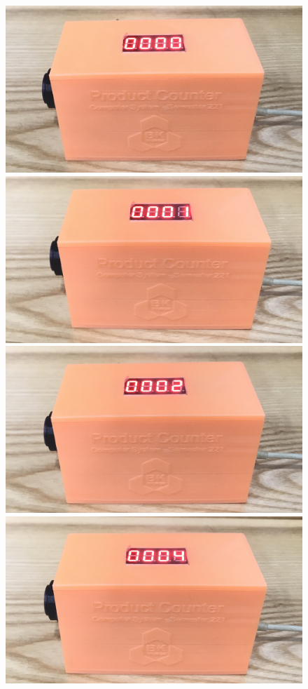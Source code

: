 \documentclass[a4paper,twoside]{report}
\begin{document}
\begin{figure}[H]
\centering
\includegraphics[scale=0.07]{images/counter_0.jpg}
\includegraphics[scale=0.07]{images/counter_1.jpg}
\includegraphics[scale=0.07]{images/counter_2.jpg}\\
\includegraphics[scale=0.07]{images/counter_4.jpg}

\end{figure}
\end{document}
